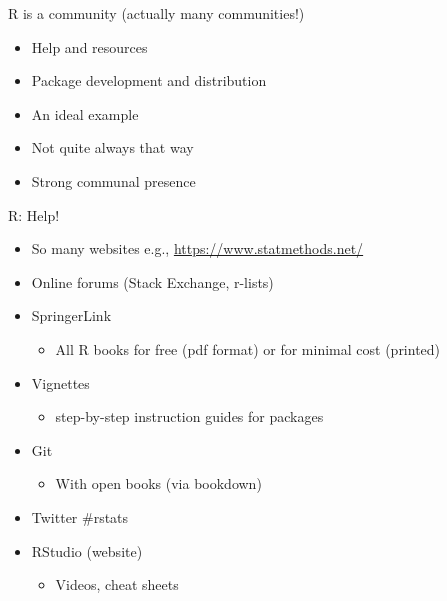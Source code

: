 \documentclass[
  ignorenonframetext,
]{beamer}
\providecommand{\tightlist}{%
  \setlength{\itemsep}{0pt}\setlength{\parskip}{0pt}}
\begin{document}
\begin{frame}{R is a community (actually many communities!)}
\protect\hypertarget{r-is-a-community-actually-many-communities}{}

\begin{itemize}
\tightlist
\item
  Help and resources
\item
  Package development and distribution
\item
  An ideal example
\item
  Not quite always that way
\item
  Strong communal presence
\end{itemize}

\end{frame}

\begin{frame}{R: Help!}
\protect\hypertarget{r-help}{}

\begin{itemize}
\tightlist
\item
  So many websites e.g., \url{https://www.statmethods.net/}
\item
  Online forums (Stack Exchange, r-lists)
\item
  SpringerLink

  \begin{itemize}
  \tightlist
  \item
    All R books for free (pdf format) or for minimal cost (printed)
  \end{itemize}
\item
  Vignettes

  \begin{itemize}
  \tightlist
  \item
    step-by-step instruction guides for packages
  \end{itemize}
\item
  Git

  \begin{itemize}
  \tightlist
  \item
    With open books (via bookdown)
  \end{itemize}
\item
  Twitter \#rstats
\item
  RStudio (website)

  \begin{itemize}
  \tightlist
  \item
    Videos, cheat sheets
  \end{itemize}
\end{itemize}

\end{frame}
\end{document}
